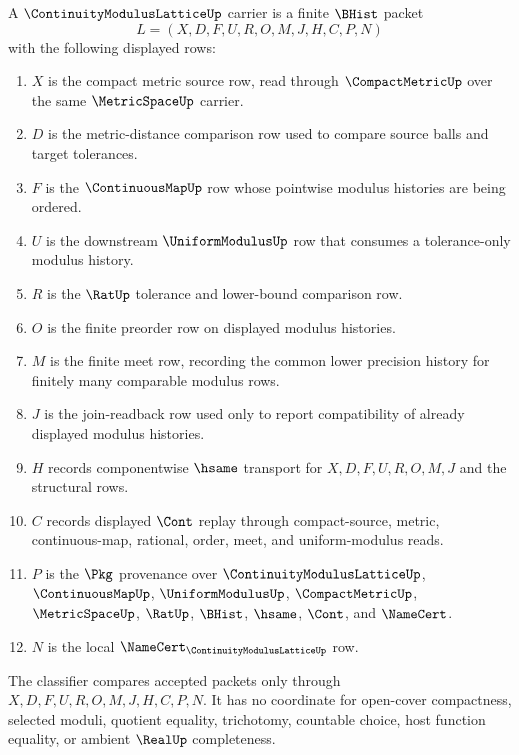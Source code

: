 \begin{definition}
\label{def:continuity-modulus-lattice-carrier}
A $\ContinuityModulusLatticeUp$ carrier is a finite $\BHist$ packet
$$
L=(X,D,F,U,R,O,M,J,H,C,P,N)
$$
with the following displayed rows:
\begin{enumerate}
\item $X$ is the compact metric source row, read through $\CompactMetricUp$ over the same $\MetricSpaceUp$ carrier.
\item $D$ is the metric-distance comparison row used to compare source balls and target tolerances.
\item $F$ is the $\ContinuousMapUp$ row whose pointwise modulus histories are being ordered.
\item $U$ is the downstream $\UniformModulusUp$ row that consumes a tolerance-only modulus history.
\item $R$ is the $\RatUp$ tolerance and lower-bound comparison row.
\item $O$ is the finite preorder row on displayed modulus histories.
\item $M$ is the finite meet row, recording the common lower precision history for finitely many comparable modulus rows.
\item $J$ is the join-readback row used only to report compatibility of already displayed modulus histories.
\item $H$ records componentwise $\hsame$ transport for $X,D,F,U,R,O,M,J$ and the structural rows.
\item $C$ records displayed $\Cont$ replay through compact-source, metric, continuous-map, rational, order, meet, and uniform-modulus reads.
\item $P$ is the $\Pkg$ provenance over $\ContinuityModulusLatticeUp$, $\ContinuousMapUp$, $\UniformModulusUp$, $\CompactMetricUp$, $\MetricSpaceUp$, $\RatUp$, $\BHist$, $\hsame$, $\Cont$, and $\NameCert$.
\item $N$ is the local $\NameCert_{\ContinuityModulusLatticeUp}$ row.
\end{enumerate}
The classifier compares accepted packets only through $X,D,F,U,R,O,M,J,H,C,P,N$. It has no coordinate for open-cover compactness, selected moduli, quotient equality, trichotomy, countable choice, host function equality, or ambient $\RealUp$ completeness.
\end{definition}

